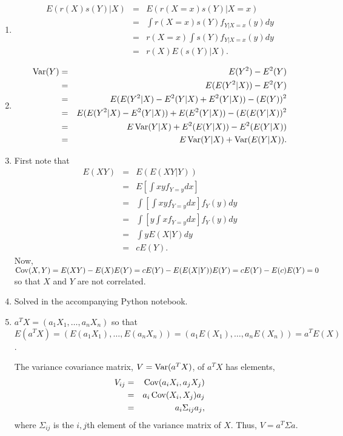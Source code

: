\documentclass{article}
\begin{document}
\begin{enumerate}
\item 
\begin{eqnarray*}
E(r(X)s(Y)|X) &=& E(r(X=x)s(Y)|X=x) \\
 &=& \int r(X=x)s(Y)f_{Y|X=x}(y)dy \\
 &=& r(X=x)\int s(Y)f_{Y|X=x}(y)dy \\
 &=& r(X)E(s(Y)|X).
\end{eqnarray*}

\item
\begin{eqnarray*}
\operatorname{Var}(Y) &=& E(Y^2) - E^2(Y) \\
 &=& E(E(Y^2|X)) - E^2(Y) \\
 &=& E(E(Y^2|X) - E^2(Y|X) + E^2(Y|X)) - (E(Y))^2 \\
 &=& E(E(Y^2|X) - E^2(Y|X)) + E(E^2(Y|X)) - (E(E(Y|X))^2 \\
 &=& E\operatorname{Var}(Y|X) + E^2(E(Y|X)) - E^2(E(Y|X)) \\
 &=& E\operatorname{Var}(Y|X) + \operatorname{Var}(E(Y|X)).
\end{eqnarray*}

\item First note that
\begin{eqnarray*}
E(XY) &=& E(E(XY|Y)) \\
 &=& E\left[\int xyf_{Y=y}dx\right] \\
 &=& \int\left[\int xyf_{Y=y}dx\right]f_Y(y)dy \\
 &=& \int\left[y\int xf_{Y=y}dx\right]f_Y(y)dy \\
 &=& \int y E(X|Y) dy \\
 &=& cE(Y).
\end{eqnarray*}
Now, $\operatorname{Cov}(X, Y) = E(XY) - E(X)E(Y) = cE(Y) - E(E(X|Y))E(Y) = cE(Y) - E(c)E(Y)
 = 0$ so that $X$ and $Y$ are not correlated.
 
\item Solved in the accompanying Python notebook.

\item $a^TX = (a_1X_1, \ldots, a_nX_n)$ so that $E(a^TX) = (E(a_1X_1), \ldots,
E(a_nX_n)) = (a_1E(X_1), \ldots, a_nE(X_n)) = a^TE(X)$.

The variance covariance matrix, $V = \operatorname{Var}(a^TX)$, of $a^TX$ has elements,
\begin{eqnarray*}
V_{ij} &=& \operatorname{Cov}(a_iX_i, a_jX_j) \\
 &=& a_i\operatorname{Cov}(X_i, X_j)a_j \\
 &=& a_i \Sigma_{ij} a_j,
\end{eqnarray*}
where $\Sigma_{ij}$ is the $i,j$th element of the variance matrix of $X$. Thus, 
$V=a^T\Sigma a$.


\end{enumerate}
\end{document}
